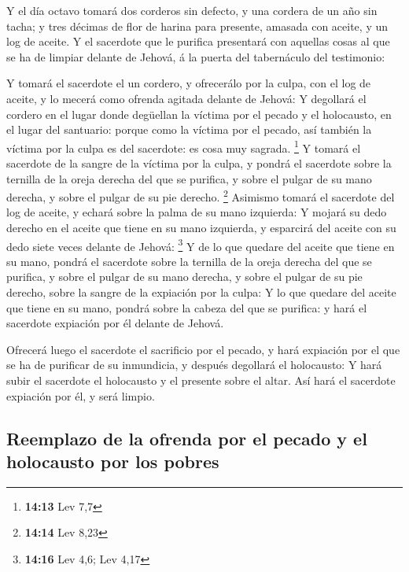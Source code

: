  Y el día octavo tomará dos corderos sin defecto, y una
cordera de un año sin tacha; y tres décimas de flor de harina para
presente, amasada con aceite, y un log de aceite.  Y el
sacerdote que le purifica presentará con aquellas cosas al que se ha de
limpiar delante de Jehová, á la puerta del tabernáculo del testimonio:

 Y tomará el sacerdote el un cordero, y ofrecerálo por la
culpa, con el log de aceite, y lo mecerá como ofrenda agitada delante de
Jehová:  Y degollará el cordero en el lugar donde
degüellan la víctima por el pecado y el holocausto, en el lugar del
santuario: porque como la víctima por el pecado, así también la víctima
por la culpa es del sacerdote: es cosa muy sagrada. \footnote{\textbf{14:13}
  Lev 7,7}  Y tomará el sacerdote de la sangre de la
víctima por la culpa, y pondrá el sacerdote sobre la ternilla de la
oreja derecha del que se purifica, y sobre el pulgar de su mano derecha,
y sobre el pulgar de su pie derecho. \footnote{\textbf{14:14} Lev 8,23}
 Asimismo tomará el sacerdote del log de aceite, y echará
sobre la palma de su mano izquierda:  Y mojará su dedo
derecho en el aceite que tiene en su mano izquierda, y esparcirá del
aceite con su dedo siete veces delante de Jehová: \footnote{\textbf{14:16}
  Lev 4,6; Lev 4,17}  Y de lo que quedare del aceite que
tiene en su mano, pondrá el sacerdote sobre la ternilla de la oreja
derecha del que se purifica, y sobre el pulgar de su mano derecha, y
sobre el pulgar de su pie derecho, sobre la sangre de la expiación por
la culpa:  Y lo que quedare del aceite que tiene en su
mano, pondrá sobre la cabeza del que se purifica: y hará el sacerdote
expiación por él delante de Jehová.

 Ofrecerá luego el sacerdote el sacrificio por el pecado,
y hará expiación por el que se ha de purificar de su inmundicia, y
después degollará el holocausto:  Y hará subir el
sacerdote el holocausto y el presente sobre el altar. Así hará el
sacerdote expiación por él, y será limpio.

\hypertarget{reemplazo-de-la-ofrenda-por-el-pecado-y-el-holocausto-por-los-pobres}{%
\subsection{Reemplazo de la ofrenda por el pecado y el holocausto por
los
pobres}\label{reemplazo-de-la-ofrenda-por-el-pecado-y-el-holocausto-por-los-pobres}}

